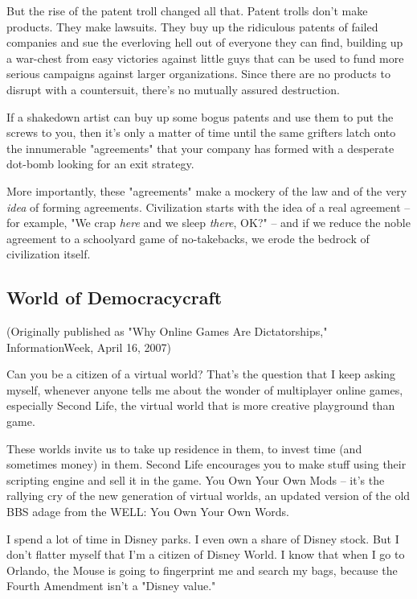 But the rise of the patent troll changed all that. Patent trolls
don't make products. They make lawsuits. They buy up the ridiculous
patents of failed companies and sue the everloving hell out of
everyone they can find, building up a war-chest from easy victories
against little guys that can be used to fund more serious campaigns
against larger organizations. Since there are no products to
disrupt with a countersuit, there's no mutually assured
destruction.

If a shakedown artist can buy up some bogus patents and use them to
put the screws to you, then it's only a matter of time until the
same grifters latch onto the innumerable "agreements" that your
company has formed with a desperate dot-bomb looking for an exit
strategy.

More importantly, these "agreements" make a mockery of the law and
of the very \emph{idea} of forming agreements. Civilization
starts with the idea of a real agreement -- for example, "We crap
\emph{here} and we sleep \emph{there}, OK?" -- and if we reduce
the noble agreement to a schoolyard game of no-takebacks, we erode
the bedrock of civilization itself.

\subsection{World of Democracycraft}

(Originally published as "Why Online Games Are Dictatorships,"
InformationWeek, April 16, 2007)

Can you be a citizen of a virtual world? That's the question that I
keep asking myself, whenever anyone tells me about the wonder of
multiplayer online games, especially Second Life, the virtual world
that is more creative playground than game.

These worlds invite us to take up residence in them, to invest time
(and sometimes money) in them. Second Life encourages you to make
stuff using their scripting engine and sell it in the game. You Own
Your Own Mods -- it's the rallying cry of the new generation of
virtual worlds, an updated version of the old BBS adage from the
WELL: You Own Your Own Words.

I spend a lot of time in Disney parks. I even own a share of Disney
stock. But I don't flatter myself that I'm a citizen of Disney
World. I know that when I go to Orlando, the Mouse is going to
fingerprint me and search my bags, because the Fourth Amendment
isn't a "Disney value."

